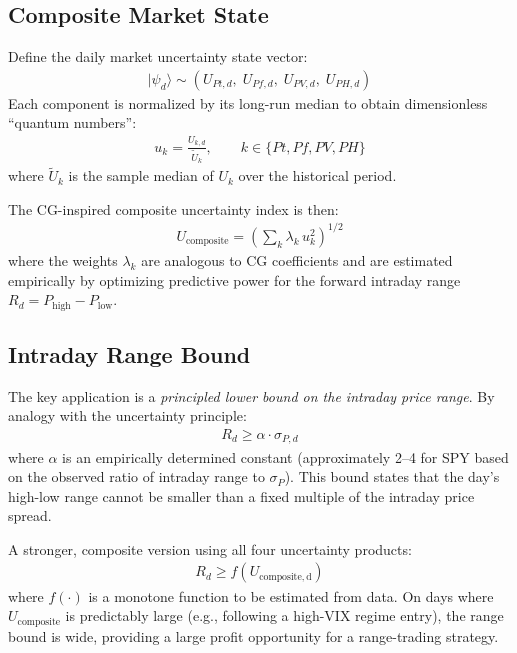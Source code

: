 \documentclass[preprint,12pt]{elsarticle}
\begin{document}
\subsection{Composite Market State}

Define the daily market uncertainty state vector:
\begin{align}
    |\psi_d\rangle \sim \left( U_{Pt,d},\; U_{Pf,d},\; U_{PV,d},\; U_{PH,d} \right)
\end{align}
Each component is normalized by its long-run median to obtain dimensionless ``quantum numbers'':
\begin{align}
    u_k = \frac{U_{k,d}}{\tilde{U}_k}, \qquad k \in \{Pt, Pf, PV, PH\}
\end{align}
where $\tilde{U}_k$ is the sample median of $U_k$ over the historical period.

The CG-inspired composite uncertainty index is then:
\begin{align}
    U_\mathrm{composite} = \left(\sum_{k} \lambda_k\, u_k^2\right)^{1/2}
\end{align}
where the weights $\lambda_k$ are analogous to CG coefficients and are estimated empirically by optimizing predictive power for the forward intraday range $R_d = P_\mathrm{high} - P_\mathrm{low}$.

\subsection{Intraday Range Bound}

The key application is a \textit{principled lower bound on the intraday price range}. By analogy with the uncertainty principle:
\begin{align}
    R_d \geq \alpha \cdot \sigma_{P,d}
\end{align}
where $\alpha$ is an empirically determined constant (approximately 2--4 for SPY based on the observed ratio of intraday range to $\sigma_P$). This bound states that the day's high-low range cannot be smaller than a fixed multiple of the intraday price spread.

A stronger, composite version using all four uncertainty products:
\begin{align}
    R_d \geq f(U_\mathrm{composite,d})
\end{align}
where $f(\cdot)$ is a monotone function to be estimated from data. On days where $U_\mathrm{composite}$ is predictably large (e.g., following a high-VIX regime entry), the range bound is wide, providing a large profit opportunity for a range-trading strategy.
\end{document}
